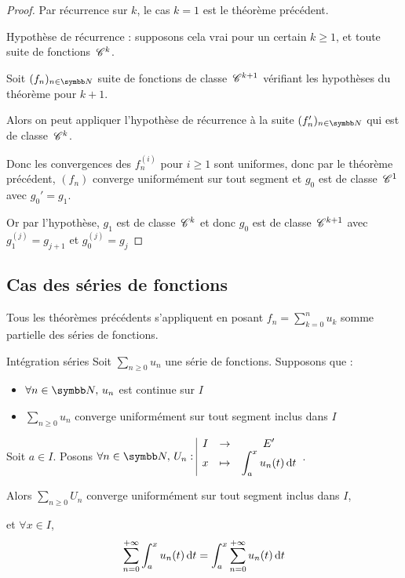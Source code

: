 
\begin{proof}
    Par récurrence sur $k$, le cas $k = 1$ est le théorème précédent.

    Hypothèse de récurrence : supposons cela vrai pour un certain $k \geqslant 1$, et toute 
    suite de fonctions $\,\mathscr C^{k}$. 

    Soit $(f_n)_{n \in \N}$ suite de fonctions de classe $\,\mathscr C^{k + 1}$ vérifiant les hypothèses du théorème pour $k + 1$.

    Alors on peut appliquer l'hypothèse de récurrence à la suite $(f_n')_{n \in \N}$ qui est de classe $\,\mathscr C^{k}$.

    Donc les convergences des $f_n^{(i)}$ pour $i \geqslant 1$ sont uniformes, donc 
    par le théorème précédent, $(f_n)$ converge uniformément sur tout segment et 
    $g_0$ est de classe $\,\mathscr C^{1}$ avec $g_0' = g_1$. 

    Or par l'hypothèse, $g_1$ est de classe $\,\mathscr C^{k}$ et donc $g_0$ est de classe $\,\mathscr C^{k + 1}$ avec
    $g_1^{(j)} = g_{j + 1}$ et $g_0^{(j)} = g_j$ 
\end{proof}

\subsection{Cas des séries de fonctions }

Tous les théorèmes précédents s'appliquent en posant $\displaystyle f_n = \sum_{k = 0}^n u_k$ somme partielle des 
séries de fonctions.

\begin{theoreme}{Intégration séries}{}
    Soit $\sum_{n \geqslant 0} u_n$ une série de fonctions. Supposons que : 
    \begin{itemize}
        \item $\forall n \in \N, \, u_n$ est continue sur $I$
        \item $\sum_{n \geqslant 0} u_n$ converge uniformément 
    sur tout segment inclus dans $I$
    \end{itemize}
    Soit $a \in I$. Posons $\forall n \in \N, \, \fonction{U_n} I {E'}{x}{\int_a^x u_n(t) \dt}$.

    Alors $\sum_{n \geqslant 0} U_n$ converge uniformément sur tout segment inclus dans $I$, 
    
    et 
    $\forall x \in I$, 
    $$\sum_{n = 0 }^{+ \infty } \int_{a }^{x } u_n(t) \,\mathrm{d}t = \int_{a}^{x } \sum_{n = 0}^{+ \infty} u_n(t) \,\mathrm{d}t$$
\end{theoreme}

